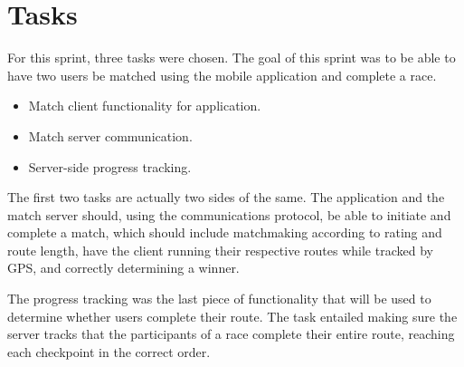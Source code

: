 \section{Tasks}
\label{sec:sprint4-tasks}

For this sprint, three tasks were chosen. The goal of this sprint was to be able to have two users be matched using the mobile application and complete a race.

\begin{itemize}
	\item{Match client functionality for application.}
	\item{Match server communication.}
	\item{Server-side progress tracking.}
\end{itemize}

The first two tasks are actually two sides of the same. The application and the match server should, using the communications protocol, be able to initiate and complete a match, which should include matchmaking according to rating and route length, have the client running their respective routes while tracked by \ac{GPS}, and correctly determining a winner.

The progress tracking was the last piece of functionality that will be used to determine whether users complete their route. The task entailed making sure the server tracks that the participants of a race complete their entire route, reaching each checkpoint in the correct order.

